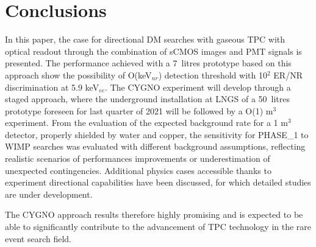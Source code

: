 \documentclass[physics,article,submit,moreauthors,pdftex]{Definitions/mdpi}
\begin{document}


\section{Conclusions}
In this paper, the case for directional DM searches with gaseous TPC with optical readout through the combination of sCMOS images and PMT signals is presented. The performance achieved with a 7~litres prototype based on this approach show the possibility of O(keV$_{nr}$) detection threshold with 10$^2$ ER/NR discrimination at 5.9 keV$_{ee}$.
The CYGNO experiment will develop through a staged approach, where the underground installation at LNGS of a 50~litres prototype foreseen for last quarter of 2021 will be followed by a O(1) m$^3$ experiment. From the evaluation of the expected background rate for a 1 m$^3$ detector, properly shielded by water and copper, the sensitivity for PHASE\_1 to WIMP searches was evaluated with different background assumptions, reflecting realistic scenarios of performances improvements or underestimation of unexpected contingencies. Additional  physics cases accessible thanks to experiment directional capabilities have been discussed, for which detailed studies are under development.  

The CYGNO approach results therefore highly promising and is expected to be able to significantly contribute to the advancement of TPC technology in the rare event search field.


\newpage
\appendixstart
\appendix
\end{document}
